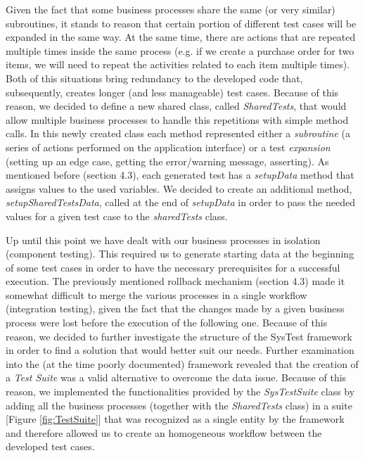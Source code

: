 Given the fact that some business processes share the same (or very similar) subroutines, it stands to reason that certain portion of different test cases will be expanded in the same way. At the same time, there are actions that are repeated multiple times inside the same process (e.g. if we create a purchase order for two items, we will need to repeat the activities related to each item multiple times). Both of this situations bring redundancy to the developed code that, subsequently, creates longer (and less manageable) test cases. Because of this reason, we decided to define a new shared class, called \textit{SharedTests}, that would allow multiple business processes to handle this repetitions with simple method calls. In this newly created class each method represented either a \textit{subroutine} (a series of actions performed on the application interface) or a test \textit{expansion} (setting up an edge case, getting the error/warning message, asserting). As mentioned before (section 4.3), each generated test has a \textit{setupData} method that assigns values to the used variables. We decided to create an additional method, \textit{setupSharedTestsData}, called at the end of \textit{setupData} in order to pass the needed values for a given test case to the \textit{sharedTests} class.

Up until this point we have dealt with our business processes in isolation (component testing). This required us to generate starting data at the beginning of some test cases in order to have the necessary prerequisites for a successful execution. The previously mentioned rollback mechanism (section 4.3) made it somewhat difficult to merge the various processes in a single workflow (integration testing), given the fact that the changes made by a given business process were lost before the execution of the following one. Because of this reason, we decided to further investigate the structure of the SysTest framework in order to find a solution that would better suit our needs.
Further examination into the (at the time poorly documented) framework revealed that the creation of a \textit{Test Suite} was a valid alternative to overcome the data issue. Because of this reason, we implemented the functionalities provided by the \textit{SysTestSuite} class by adding all the business processes (together with the \textit{SharedTests} class) in a suite [Figure \ref{fig:TestSuite}] that was recognized as a single entity by the framework and therefore allowed us to create an homogeneous workflow between the developed test cases.

